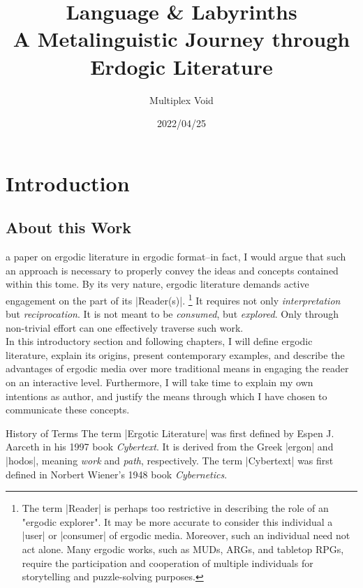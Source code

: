 \documentclass[10pt,twoside,twocolumn,openany,nomultitoc]{book}
\title{Language \& Labyrinths\\{%
\large A Metalinguistic Journey through Erdogic Literature}}
\author{Multiplex Void}
\date{2022/04/25}
\begin{document}
\frontmatter
\maketitle
\tableofcontents
\mainmatter

\part{Introduction}   %

\chapter{About this Work}

 a paper on ergodic literature in ergodic format--in fact, I would argue that such an approach is necessary to properly convey the ideas and concepts contained within this tome. By its very nature, ergodic literature demands active engagement on the part of its 
|Reader(s)|.
    \footnote{The term |Reader| is perhaps too restrictive in describing the role of an "ergodic explorer". It may be more accurate to consider this individual a |user| or |consumer| of ergodic media. Moreover, such  an individual need not act alone. Many ergodic works, such as MUDs, ARGs, and tabletop RPGs, require the participation and cooperation of multiple individuals for storytelling and puzzle-solving purposes.}         
It requires not only \textit{interpretation} but \textit{reciprocation}. It is not meant to be \textit{consumed}, but \textit{explored}. Only through non-trivial effort can one effectively traverse such work. \\ 

    In this introductory section and following chapters, I will define ergodic literature, explain its origins, present contemporary examples, and describe the advantages of ergodic media over more traditional means in engaging the reader on an interactive level. Furthermore, I will take time to explain my own intentions as author, and justify the means through which I have chosen to communicate these concepts.

\begin{DndSidebar}[]{History of Terms}
  The term |Ergotic Literature| was first defined by Espen J. Aarceth in his 1997 book \textit{Cybertext}. It is derived from the Greek |ergon| and |hodos|, meaning \textit{work} and \textit{path}, respectively. The term |Cybertext| was first defined in Norbert Wiener's 1948 book \textit{Cybernetics}.
\end{DndSidebar}
    
\end{document}
